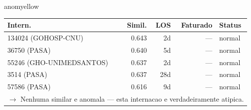 \documentclass[a4paper,10pt]{article}
\begin{document}
\begin{anomalycard}[Internacao 126 | GHO-POSTAL | MODERADO (z=2.09)]{anomyellow}
\begin{tabular}{l r r r l}\toprule\textbf{Intern.} & \textbf{Simil.} & \textbf{LOS} & \textbf{Faturado} & \textbf{Status} \\\midrule
134024 (GOHOSP-CNU) & 0.643 & 2d & --- & \textcolor{jcubeblue}{normal} \\
36750 (PASA) & 0.640 & 5d & --- & \textcolor{jcubeblue}{normal} \\
55246 (GHO-UNIMEDSANTOS) & 0.637 & 2d & --- & \textcolor{jcubeblue}{normal} \\
3514 (PASA) & 0.637 & 28d & --- & \textcolor{jcubeblue}{normal} \\
57586 (PASA) & 0.616 & 9d & --- & \textcolor{jcubeblue}{normal} \\
\multicolumn{5}{l}{\textcolor{jcubeblue}{\small $\rightarrow$ Nenhuma similar e anomala --- esta internacao e verdadeiramente atipica.}} \\
\bottomrule\end{tabular}


\end{anomalycard}

\newpage
\end{document}
